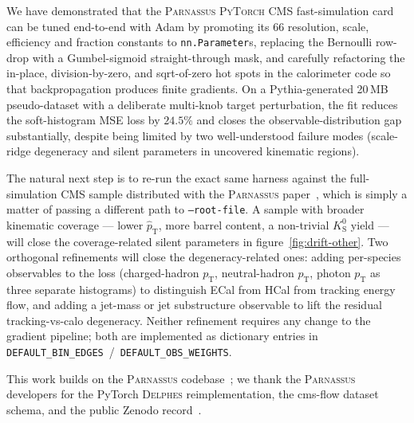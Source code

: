 \documentclass[a4paper,11pt]{article}
\begin{document}
We have demonstrated that the \textsc{Parnassus} \textsc{PyTorch} CMS
fast-simulation card can be tuned end-to-end with Adam by
promoting its 66 resolution, scale, efficiency and fraction constants
to \texttt{nn.Parameter}s, replacing the Bernoulli row-drop with a
Gumbel-sigmoid straight-through mask, and carefully refactoring the
in-place, division-by-zero, and sqrt-of-zero hot spots in the
calorimeter code so that backpropagation produces finite gradients.
On a Pythia-generated 20\,MB pseudo-dataset with a deliberate
multi-knob target perturbation, the fit reduces the soft-histogram
MSE loss by $24.5\%$ and closes the observable-distribution gap
substantially, despite being limited by two well-understood failure
modes (scale-ridge degeneracy and silent parameters in uncovered
kinematic regions).

The natural next step is to re-run the exact same harness against the
full-simulation CMS sample distributed with the \textsc{Parnassus}
paper~\cite{parnassus_zenodo}, which is simply a matter of passing a
different path to \texttt{--root-file}. A sample with broader
kinematic coverage --- lower $\hat{p}_\mathrm{T}$, more barrel content,
a non-trivial $K^{0}_{\mathrm{S}}$ yield --- will close the
coverage-related silent parameters in figure~\ref{fig:drift-other}.
Two orthogonal refinements will close the degeneracy-related ones:
adding per-species observables to the loss (charged-hadron
$p_\mathrm{T}$, neutral-hadron $p_\mathrm{T}$, photon $p_\mathrm{T}$
as three separate histograms) to distinguish ECal from HCal from
tracking energy flow, and adding a jet-mass or jet substructure
observable to lift the residual tracking-vs-calo degeneracy. Neither
refinement requires any change to the gradient pipeline; both are
implemented as dictionary entries in
\texttt{DEFAULT\_BIN\_EDGES}~/~\texttt{DEFAULT\_OBS\_WEIGHTS}.

\acknowledgments

This work builds on the \textsc{Parnassus} codebase~\cite{parnassus};
we thank the \textsc{Parnassus} developers for the PyTorch
\textsc{Delphes} reimplementation, the cms-flow dataset schema, and
the public Zenodo record~\cite{parnassus_zenodo}.
\end{document}
